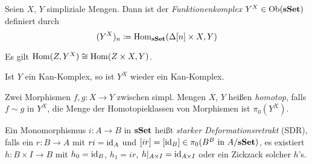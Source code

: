 \documentclass{cheat-sheet}
\newenvironment{centertikzcd}
  {\begin{center}\begin{tikzcd}}
  {\end{tikzcd}\end{center}}
\begin{document}

\begin{defn}
  Seien $X$, $Y$ simpliziale Mengen. Dann ist der \emph{Funktionenkomplex} $Y^X \in \operatorname{Ob}(\mathbf{sSet})$ definiert durch
  \[ (Y^X)_n \coloneqq \operatorname{Hom}_{\mathbf{sSet}}(\Delta[n] \times X, Y) \]
\end{defn}

\begin{bem}
  Es gilt $\operatorname{Hom}(Z, Y^X) \cong \operatorname{Hom}(Z \times X, Y)$.
\end{bem}

\begin{kor}
  Ist $Y$ ein Kan-Komplex, so ist $Y^X$ wieder ein Kan-Komplex.
\end{kor}

\begin{defn}
  Zwei Morphismen $f, g : X \to Y$ zwischen simpl. Mengen $X$, $Y$ heißen \emph{homotop}, falls $f \sim g$ in $Y^X$, \dh{} die Menge der Homotopieklassen von Morphismen ist $\pi_0(Y^X)$.
\end{defn}


\begin{defn}
  Ein Monomorphismus $i : A \to B$ in $\mathbf{sSet}$ heißt \emph{starker Deformationsretrakt} (SDR), falls ein $r : B \to A$ mit $ri = \operatorname{id}_A$ und $[ir] = [\operatorname{id}_B] \in \pi_0(B^B \text{ in } A/\mathbf{sSet})$, \dh{} es existiert $h : B \times I \to B$ mit $h_0 = \operatorname{id}_B$, $h_1 = ir$, $h|_{A \times I} = \operatorname{id}_{A \times I}$ oder ein Zickzack solcher $h$'s.
\end{defn}
\end{document}
